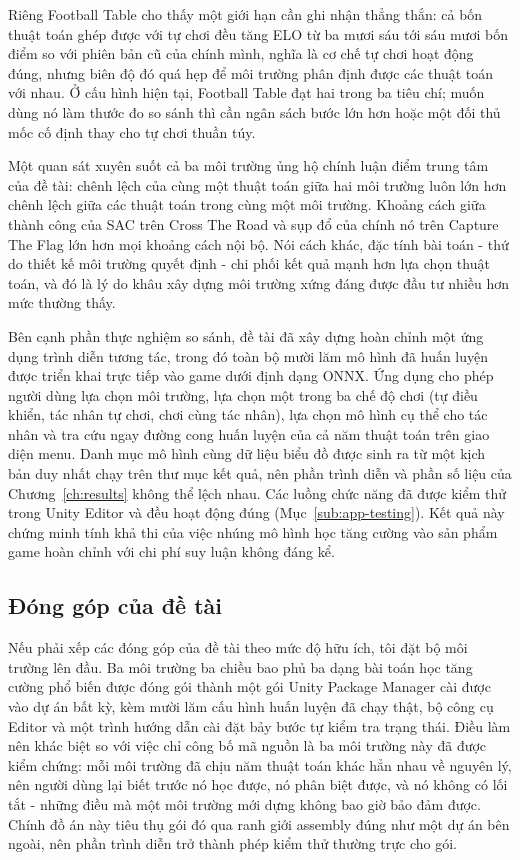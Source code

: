 \indent Riêng Football Table cho thấy một giới hạn cần ghi nhận thẳng thắn: cả bốn thuật
toán ghép được với tự chơi đều tăng ELO từ ba mươi sáu tới sáu mươi bốn điểm so với
phiên bản cũ của chính mình, nghĩa là cơ chế tự chơi hoạt động đúng, nhưng biên độ đó
quá hẹp để môi trường phân định được các thuật toán với nhau. Ở cấu hình hiện tại,
Football Table đạt hai trong ba tiêu chí; muốn dùng nó làm thước đo so sánh thì cần
ngân sách bước lớn hơn hoặc một đối thủ mốc cố định thay cho tự chơi thuần túy.

\indent Một quan sát xuyên suốt cả ba môi trường ủng hộ chính luận điểm trung tâm của
đề tài: chênh lệch của cùng một thuật toán giữa hai môi trường luôn lớn hơn chênh lệch
giữa các thuật toán trong cùng một môi trường. Khoảng cách giữa thành công của SAC trên
Cross The Road và sụp đổ của chính nó trên Capture The Flag lớn hơn mọi khoảng cách nội
bộ. Nói cách khác, đặc tính bài toán - thứ do thiết kế môi trường quyết định - chi phối
kết quả mạnh hơn lựa chọn thuật toán, và đó là lý do khâu xây dựng môi trường xứng đáng
được đầu tư nhiều hơn mức thường thấy.

\indent Bên cạnh phần thực nghiệm so sánh, đề tài đã xây dựng hoàn chỉnh một ứng dụng
trình diễn tương tác, trong đó toàn bộ mười lăm mô hình đã huấn luyện được triển
khai trực tiếp vào game dưới định dạng ONNX. Ứng dụng cho phép người dùng lựa chọn môi
trường, lựa chọn một trong ba chế độ chơi (tự điều khiển, tác nhân tự chơi, chơi cùng
tác nhân), lựa chọn mô hình cụ thể cho tác nhân và
tra cứu ngay đường cong huấn luyện của cả năm thuật toán trên giao diện menu. Danh mục
mô hình cùng dữ liệu biểu đồ được sinh ra từ một kịch bản duy nhất chạy trên thư mục
kết quả, nên phần trình diễn và phần số liệu của Chương~\ref{ch:results} không thể lệch
nhau. Các luồng chức năng đã được kiểm thử trong Unity Editor và đều hoạt động đúng
(Mục~\ref{sub:app-testing}). Kết quả này chứng minh tính khả thi của
việc nhúng mô hình học tăng cường vào sản phẩm game hoàn chỉnh với chi phí suy luận
không đáng kể.

\subsection{Đóng góp của đề tài}
\indent Nếu phải xếp các đóng góp của đề tài theo mức độ hữu ích, tôi đặt bộ môi trường
lên đầu. Ba môi trường ba chiều bao phủ ba dạng bài toán học tăng cường phổ biến được
đóng gói thành một gói Unity Package Manager cài được vào dự án bất kỳ, kèm mười lăm cấu
hình huấn luyện đã chạy thật, bộ công cụ Editor và một trình hướng dẫn cài đặt bảy bước
tự kiểm tra trạng thái. Điều làm nên khác biệt so với việc chỉ công bố mã nguồn là ba
môi trường này đã được kiểm chứng: mỗi môi trường đã chịu năm thuật toán khác hẳn nhau
về nguyên lý, nên người dùng lại biết trước nó học được, nó phân biệt được, và nó không
có lối tắt - những điều mà một môi trường mới dựng không bao giờ bảo đảm được. Chính đồ
án này tiêu thụ gói đó qua ranh giới assembly đúng như một dự án bên ngoài, nên phần
trình diễn trở thành phép kiểm thử thường trực cho gói.

